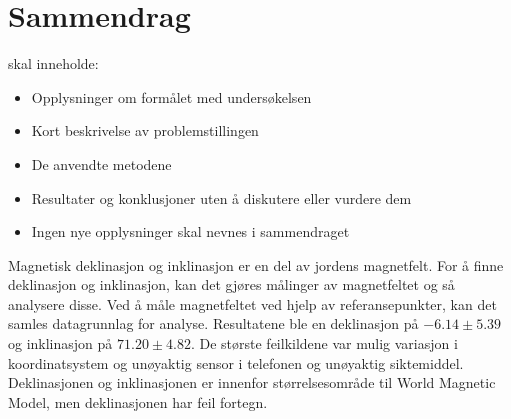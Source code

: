 
\section*{Sammendrag}
skal inneholde:
\begin{itemize}
    \item Opplysninger om formålet med undersøkelsen
    \item Kort beskrivelse av problemstillingen
    \item De anvendte metodene
    \item Resultater og konklusjoner uten å diskutere eller vurdere dem
    \item Ingen nye opplysninger skal nevnes i sammendraget
\end{itemize}

Magnetisk deklinasjon og inklinasjon er en del av jordens magnetfelt. For å finne deklinasjon og inklinasjon, kan det gjøres målinger av magnetfeltet og så analysere disse. Ved å måle magnetfeltet ved hjelp av referansepunkter, kan det samles datagrunnlag for analyse. Resultatene ble en deklinasjon på $-6.14\pm{5.39}$\textdegree og inklinasjon på $71.20\pm{4.82}$\textdegree. De største feilkildene var mulig variasjon i koordinatsystem og unøyaktig sensor i telefonen og unøyaktig siktemiddel. Deklinasjonen og inklinasjonen er innenfor størrelsesområde til World Magnetic Model, men deklinasjonen har feil fortegn.    


